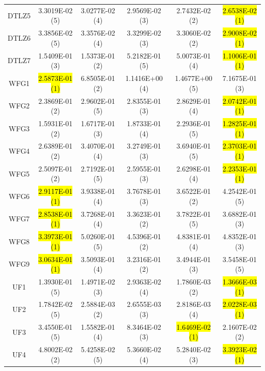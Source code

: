 \documentclass[journal]{IEEEtran}
\begin{document}
\begin{table}[tbp]
\begin{tabular}{cccccc}
    DTLZ5           & 3.3019E-02 (5)      & 3.0277E-02 (4)      & 2.9569E-02 (3)    & 2.7432E-02 (2)      & \hl{2.6538E-02 (1)} \\
    DTLZ6           & 3.3856E-02 (5)      & 3.3576E-02 (4)      & 3.3299E-02 (3)    & 3.3060E-02 (2)      & \hl{2.9008E-02 (1)} \\
    DTLZ7           & 1.5409E-01 (3)      & 1.5373E-01 (2)      & 5.2182E-01 (5)    & 5.0073E-01 (4)      & \hl{1.1006E-01 (1)} \\
    \hline
    WFG1            & \hl{2.5873E-01 (1)} & 6.8505E-01 (2)      & 1.1416E+00 (4)    & 1.4677E+00 (5)      & 7.1675E-01 (3)      \\
    WFG2            & 2.3869E-01 (2)      & 2.9602E-01 (5)      & 2.8355E-01 (3)    & 2.8629E-01 (4)      & \hl{2.0742E-01 (1)} \\
    WFG3            & 1.5931E-01 (2)      & 1.6717E-01 (3)      & 1.8733E-01 (4)    & 2.2936E-01 (5)      & \hl{1.2825E-01 (1)} \\
    WFG4            & 2.6389E-01 (2)      & 3.4070E-01 (4)      & 3.2749E-01 (3)    & 3.6940E-01 (5)      & \hl{2.3703E-01 (1)} \\
    WFG5            & 2.5097E-01 (2)      & 2.7192E-01 (5)      & 2.5955E-01 (3)    & 2.6298E-01 (4)      & \hl{2.2353E-01 (1)} \\
    WFG6            & \hl{2.9117E-01 (1)} & 3.9338E-01 (4)      & 3.7678E-01 (3)    & 3.6522E-01 (2)      & 4.2542E-01 (5)      \\
    WFG7            & \hl{2.8538E-01 (1)} & 3.7268E-01 (4)      & 3.3623E-01 (2)    & 3.7822E-01 (5)      & 3.6882E-01 (3)      \\
    WFG8            & \hl{3.3973E-01 (1)} & 5.0260E-01 (5)      & 4.5396E-01 (2)    & 4.8381E-01 (4)      & 4.8352E-01 (3)      \\
    WFG9            & \hl{3.0634E-01 (1)} & 3.5093E-01 (4)      & 3.2316E-01 (2)    & 3.4944E-01 (3)      & 3.5458E-01 (5)      \\
    \hline
    UF1             & 1.3930E-01 (5)      & 1.4971E-02 (3)      & 2.9363E-02 (4)    & 1.7860E-03 (2)      & \hl{1.3666E-03 (1)} \\
    UF2             & 1.7842E-02 (5)      & 2.5884E-03 (2)      & 2.6555E-03 (3)    & 2.8186E-03 (4)      & \hl{2.0228E-03 (1)} \\
    UF3             & 3.4550E-01 (5)      & 1.5582E-01 (4)      & 8.3464E-02 (3)    & \hl{1.6469E-02 (1)} & 2.1607E-02 (2)      \\
    UF4             & 4.8002E-02 (2)      & 5.4258E-02 (5)      & 5.3660E-02 (4)    & 5.2840E-02 (3)      & \hl{3.3923E-02 (1)} \\

\end{tabular}
\end{table}
\end{document}
